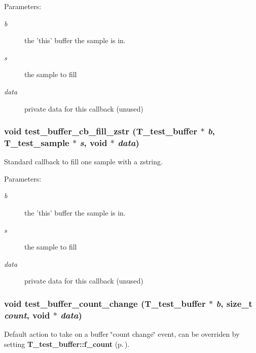 \begin{Desc}
\item[Parameters: ]\par
\begin{description}
\item[{\em 
b}]the 'this' buffer the sample is in. \item[{\em 
s}]the sample to fill \item[{\em 
data}]private data for this callback (unused) \end{description}
\end{Desc}
\subsubsection{\setlength{\rightskip}{0pt plus 5cm}void test\_\-buffer\_\-cb\_\-fill\_\-zstr ({\bf T\_\-test\_\-buffer} $\ast$ {\em b}, {\bf T\_\-test\_\-sample} $\ast$ {\em s}, void $\ast$ {\em data})}\label{test__utils_8h_a46}


Standard callback to fill one sample with a zstring.

\begin{Desc}
\item[Parameters: ]\par
\begin{description}
\item[{\em 
b}]the 'this' buffer the sample is in. \item[{\em 
s}]the sample to fill \item[{\em 
data}]private data for this callback (unused) \end{description}
\end{Desc}
\subsubsection{\setlength{\rightskip}{0pt plus 5cm}void test\_\-buffer\_\-count\_\-change ({\bf T\_\-test\_\-buffer} $\ast$ {\em b}, size\_\-t {\em count}, void $\ast$ {\em data})}\label{test__utils_8h_a49}


Default action to take on a buffer \char`\"{}count change\char`\"{} event, can be overriden by setting {\bf T\_\-test\_\-buffer::f\_\-count} {\rm (p.\,\pageref{structT__test__buffer_m22})}.

